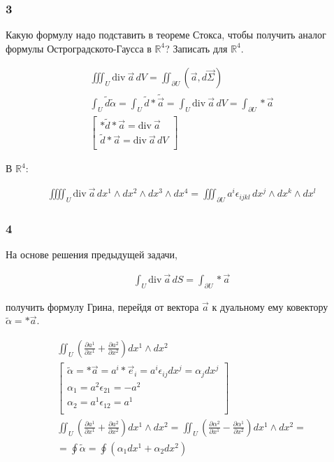 \subsubsection{3}

Какую формулу надо подставить в теореме Стокса, чтобы получить аналог
формулы Остроградското-Гаусса в \(\mathbb{R}^{4}\)? Записать для
\(\mathbb{R}^{4}\).

$$\begin{gather}
\iiint_{U} \mathrm{div} \ \vec{a} \, dV = \iint_{\partial U} (\vec{a}, d\vec{\Sigma}) \\
\int_{U} \tilde{d} \tilde{\alpha}  = \int _{U} \tilde{d}*\tilde{\vec{a}} = \int_{U} \mathrm{div} \ \vec{a} \, dV = \int_{\partial U} *\vec{a} \\
\begin{bmatrix}
*\tilde{d}*\vec{a} = \mathrm{div} \ \vec{a} \\
\tilde{d}*\vec{a} = \mathrm{div} \ \vec{a} \, dV \\
\end{bmatrix}
\end{gather}$$

В \(\mathbb{R}^{4}\):

$$\begin{gather}
\iiiint_{U} \mathrm{div} \ \vec{a} \, dx^{1}\wedge dx^{2} \wedge dx^{3} \wedge dx^{4} = \iiint_{\partial U} a^{i}\epsilon_{ijkl} \, dx^{j} \wedge dx^{k} \wedge dx^{l}
\end{gather}$$

\subsubsection{4}

На основе решения предыдущей задачи,

$$\begin{gather}
\int_{U} \mathrm{div} \ \vec{a} \, dS = \int_{\partial  U} *\vec{a}
\end{gather}$$

получить формулу Грина, перейдя от вектора \(\vec{a}\) к дуальному ему
ковектору \(\tilde{\alpha} = *\vec{a}\).

$$\begin{gather}
\iint_{U} \left( \frac{\partial a^{1}}{\partial x^{1}} + \frac{\partial a^{2}}{\partial x^{2}} \right) dx^{1} \wedge dx^{2} \\
\begin{bmatrix}
\tilde{\alpha} = *\vec{a} = a^{i}*\vec{e}_{i} = a^{i}\epsilon_{ij} dx^{j} = \alpha_{j}dx^{j} \\
\alpha_{1} = a^{2}\epsilon_{21} = -a^{2} \\
\alpha_{2} = a^{1}\epsilon_{12} = a^{1} \\
\end{bmatrix} \\
\iint_{U} \left( \frac{\partial a^{1}}{\partial x^{1}} + \frac{\partial a^{2}}{\partial x^{2}} \right) dx^{1} \wedge dx^{2} = \iint_{U} \left( \frac{\partial \alpha^{2}}{\partial x^{1}} - \frac{\partial \alpha^{1}}{\partial x^{2}} \right) dx^{1} \wedge dx^{2} = \\
= \oint \tilde{\alpha} = \oint \left(\alpha_{1}dx^{1} + \alpha_{2}dx^{2} \right)
\end{gather}$$

